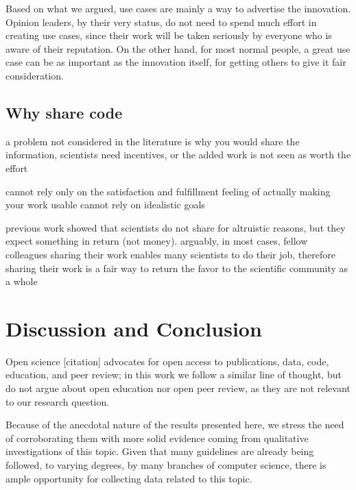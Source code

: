 \documentclass[12pt]{article}
\begin{document}
Based on what we argued, use cases are mainly a way to advertise the innovation. Opinion leaders, by their very status, do not need to spend much effort in creating use cases, since their work will be taken seriously by everyone who is aware of their reputation. On the other hand, for most normal people, a great use case can be as important as the innovation itself, for getting others to give it fair consideration.

\subsection{Why share code}
\label{sec:org2c0f0b7}
a problem not considered in the literature is why you would share the information, scientists need incentives, or the added work is not seen as worth the effort

cannot rely only on the satisfaction and fulfillment feeling of actually making your work usable
cannot rely on idealistic goals

previous work showed that scientists do not share for altruistic reasons, but they expect something in return (not money). arguably, in most cases, fellow colleagues sharing their work enables many scientists to do their job, therefore sharing their work is a fair way to return the favor to the scientific community as a whole


\section{Discussion and Conclusion}
\label{sec:org149295e}
Open science [citation] advocates for open access to publications, data, code, education, and peer review; in this work we follow a similar line of thought, but do not argue about open education nor open peer review, as they are not relevant to our research question.

Because of the anecdotal nature of the results presented here, we stress the need of corroborating them with more solid evidence coming from qualitative investigations of this topic. Given that many guidelines are already being followed, to varying degrees, by many branches of computer science, there is ample opportunity for collecting data related to this topic.
\end{document}
